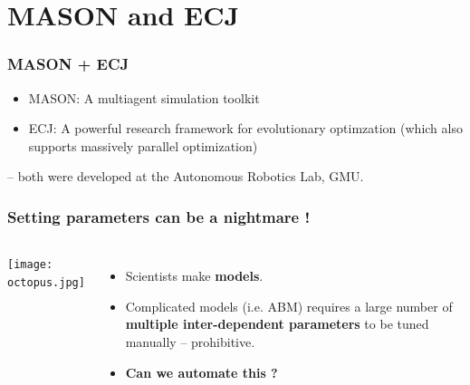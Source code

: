 \documentclass{beamer}
\begin{document}
\section{MASON and ECJ}
\begin{frame}
	\frametitle{MASON + ECJ}	
	\begin{block}{}
		\begin{itemize}
			\setlength{\itemsep}{20pt}
			\item MASON: A multiagent simulation toolkit 			
			\item ECJ: A powerful research framework for evolutionary optimzation (which also supports massively parallel optimization)
		\end{itemize}
	\end{block}
	-- both were developed at the Autonomous Robotics Lab, GMU.
\end{frame}
\begin{frame}
	\frametitle{Setting parameters can be a nightmare !}
	\begin{columns}[c]
	\column{2in}
		\centering
		\texttt{[image: octopus.jpg]}
	\column{2.5in}
			\begin{itemize}
			\setlength{\itemsep}{15pt}
				\item Scientists make \textbf{models}.
				\item Complicated models (i.e. ABM) requires a large number of \textbf{multiple inter-dependent parameters} to be tuned manually -- prohibitive.
				\item \textbf{Can we automate this ?}
			\end{itemize}
	\end{columns}
\end{frame}
\end{document}
